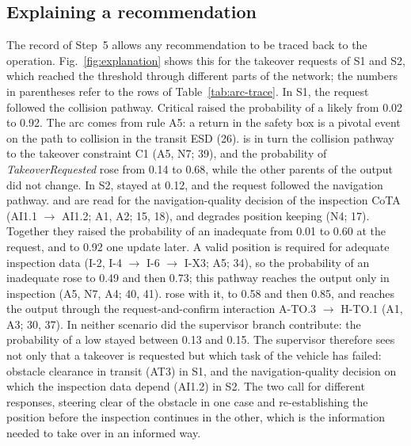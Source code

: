 \subsection{Explaining a recommendation}
\label{sec:res-explanation}

The record of Step~5 allows any recommendation to be traced back to the operation. Fig.~\ref{fig:explanation} shows this for the takeover requests of S1 and S2, which reached the threshold through different parts of the network; the numbers in parentheses refer to the rows of Table~\ref{tab:arc-trace}. In S1, the request followed the collision pathway.  Critical raised the probability of a likely  from 0.02 to 0.92. The arc comes from rule A5: a return in the safety box is a pivotal event on the path to collision in the transit ESD (26).  is in turn the collision pathway to the takeover constraint C1 (A5, N7; 39), and the probability of \emph{TakeoverRequested} rose from 0.14 to 0.68, while the other parents of the output did not change. In S2,  stayed at 0.12, and the request followed the navigation pathway.  and  are read for the navigation-quality decision of the inspection CoTA (AI1.1 $\rightarrow$ AI1.2; A1, A2; 15, 18), and  degrades position keeping (N4; 17). Together they raised the probability of an inadequate  from 0.01 to 0.60 at the request, and to 0.92 one update later. A valid position is required for adequate inspection data (I-2, I-4 $\rightarrow$ I-6 $\rightarrow$ I-X3; A5; 34), so the probability of an inadequate  rose to 0.49 and then 0.73; this pathway reaches the output only in inspection (A5, N7, A4; 40, 41).  rose with it, to 0.58 and then 0.85, and reaches the output through the request-and-confirm interaction A-TO.3 $\rightarrow$ H-TO.1 (A1, A3; 30, 37). In neither scenario did the supervisor branch contribute: the probability of a low  stayed between 0.13 and 0.15. The supervisor therefore sees not only that a takeover is requested but which task of the vehicle has failed: obstacle clearance in transit (AT3) in S1, and the navigation-quality decision on which the inspection data depend (AI1.2) in S2. The two call for different responses, steering clear of the obstacle in one case and re-establishing the position before the inspection continues in the other, which is the information needed to take over in an informed way.

